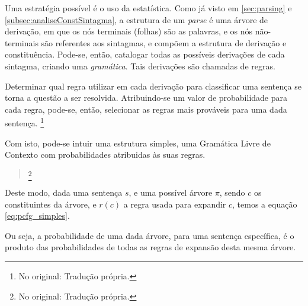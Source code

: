 Uma estratégia possível é o uso da estatística. Como já visto em \ref{sec:parsing} e \ref{subsec:analiseConstSintagma}, a estrutura de um \textit{parse} é uma árvore de derivação, em que os nós terminais (folhas) são as palavras, e os nós não-terminais são referentes aos sintagmas, e compõem a estrutura de derivação e constituência. Pode-se, então, catalogar todas as possíveis derivações de cada sintagma, criando uma \textit{gramática}. Tais derivações são chamadas de regras.

Determinar qual regra utilizar em cada derivação para classificar uma sentença se torna a questão a ser resolvida. Atribuindo-se um valor de probabilidade para cada regra, pode-se, então, selecionar as regras mais prováveis para uma dada sentença. \cite[p~37]{charniak97statistical} 
\footnote{No original:  Tradução própria.}

Com isto, pode-se intuir uma estrutura simples, uma Gramática Livre de Contexto com probabilidades atribuidas às suas regras. \cite[p~382]{Manning1999FoundationsNLP}
\begin{quote}
    \footnote{No original:  Tradução própria.}
\end{quote}
    
Deste modo, dada uma sentença $s$, e uma possível árvore $\pi$, sendo $c$ os constituintes da árvore, e $r(c)$ a regra usada para expandir $c$, temos a equação \ref{eq:pcfg_simples}.
\begin{center}
       
\end{center}
Ou seja, a probabilidade de uma dada árvore, para uma sentença específica, é o produto das probabilidades de todas as regras de expansão desta mesma árvore.

